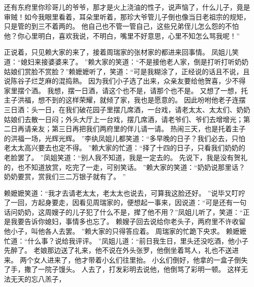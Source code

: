 还有东府里你珍哥儿的爷爷，那才是火上浇油的性子，说声恼了，什么儿子，竟是审贼！如今我眼里看着，耳朵里听着，那珍大爷管儿子倒也像当日老祖宗的规矩，只是管的到三不着两的。
他自己也不管一管自己，这些兄弟侄儿怎么怨的不怕他？你心里明白，喜欢我说，不明白，嘴里不好意思，心里不知怎么骂我呢！”\par
正说着，只见赖大家的来了，接着周瑞家的张材家的都进来回事情。
凤姐儿笑道：“媳妇来接婆婆来了。
”赖大家的笑道：“不是接他老人家，倒是打听打听奶奶姑娘们赏脸不赏脸？”赖嬷嬷听了，笑道：“可是我糊涂了，正经说的话且不说，且说陈谷子烂芝麻的混捣熟。
因为我们小子选了出来，众亲友要给他贺喜，少不得家里摆个酒。
我想，摆一日酒，请这个也不是，请那个也不是。
又想了一想，托主子洪福，想不到的这样荣耀，就倾了家，我也是愿意的。
因此吩咐他老子连摆三日酒：头一日，在我们破花园子里摆几席酒，一台戏，请老太太、太太们、奶奶姑娘们去散一日闷；外头大厅上一台戏，摆几席酒，请老爷们、爷们去增增光；第二日再请亲友；第三日再把我们两府里的伴儿请一请。
热闹三天，也是托着主子的洪福一场，光辉光辉。
”李纨凤姐儿都笑道：“多早晚的日子？我们必去，只怕老太太高兴要去也定不得。
”赖大家的忙道：“择了十四的日子，只看我们奶奶的老脸罢了。
”凤姐笑道：“别人我不知道，我是一定去的。
先说下，我是没有贺礼的，也不知道放赏，吃完了一走，可别笑话。
”赖大家的笑道：“奶奶说那里话？奶奶要赏，赏我们三二万银子就有了。
”
\par
赖嬷嬷笑道：“我才去请老太太，老太太也说去，可算我这脸还好。
”说毕又叮咛了一回，方起身要走，因看见周瑞家的，便想起一事来，因说道：“可是还有一句话问奶奶，这周嫂子的儿子犯了什么不是，撵了他不用？”凤姐儿听了，笑道：“正是我要告诉你媳妇，事情多也忘了。
赖嫂子回去说给你老头子，两府里不许收留他小子，叫他各人去罢。
”赖大家的只得答应着。
周瑞家的忙跪下央求。
赖嬷嬷忙道：“什么事？说给我评评。
”凤姐儿道：“前日我生日，里头还没吃酒，他小子先醉了。
老娘那边送了礼来，他不说在外头张罗，他倒坐着骂人，礼也不送进来。
两个女人进来了，他才带着小幺们往里抬。
小幺们倒好，他拿的一盒子倒失了手，撒了一院子馒头。
人去了，打发彩明去说他，他倒骂了彩明一顿。
这样无法无天的忘八羔子，
